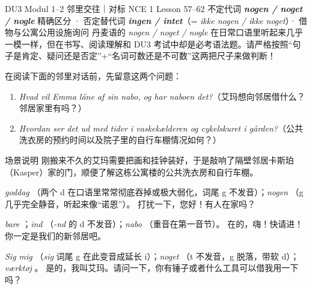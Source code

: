 {DU3 Modul 1--2 邻里交往｜对标 NCE 1 Lesson 57--62}
{不定代词 \textbf{\textit{nogen / noget / nogle}} 精确区分 · 否定替代词 \textbf{\textit{ingen / intet}}（= \textit{ikke nogen / ikke noget}）· 借物与公寓公用设施询问}
{丹麦语的 \textit{nogen / noget / nogle} 在日常口语里听起来几乎一模一样，但在书写、阅读理解和 DU3 考试中却是必考语法题。请严格按照“句子是肯定、疑问还是否定”+“名词可数还是不可数”这两把尺子来做判断！}

\begin{foerduleaeser}
在阅读下面的邻里对话前，先留意这两个问题：
\begin{enumerate}
  \item \textit{Hvad vil Emma låne af sin nabo, og har naboen det?}（艾玛想向邻居借什么？邻居家里有吗？）
  \item \textit{Hvordan ser det ud med tider i vaskekælderen og cykelskuret i gården?}（公共洗衣房的预约时间以及院子里的自行车棚情况如何？）
\end{enumerate}
\end{foerduleaeser}


\begin{tipbox}{场景说明}
刚搬来不久的艾玛需要把画和挂钟装好，于是敲响了隔壁邻居卡斯珀（Kasper）家的门，顺便了解这栋公寓楼的公共洗衣房和自行车棚。
\end{tipbox}

{\textit{goddag} （两个 d 在口语里常常彻底吞掉或极大弱化，词尾 g 不发音）；\textit{nogen} （g 几乎完全静音，听起来像“诺恩”）。}
{打扰一下，您好！有人在家吗？}

{\textit{bare} ；\textit{ind} （\textit{-nd} 的 d 不发音）；\textit{nabo} （重音在第一音节）。}
{在的，嗨！快请进！你一定是我们的新邻居吧。}

{\textit{Sig mig} （\textit{sig} 词尾 g 在此变音成延长 i）；\textit{noget} （t 不发音，g 脱落，带软 d）；\textit{værktøj} 。}
{是的，我叫艾玛。请问一下，你有锤子或者什么工具可以借我用一下吗？}


